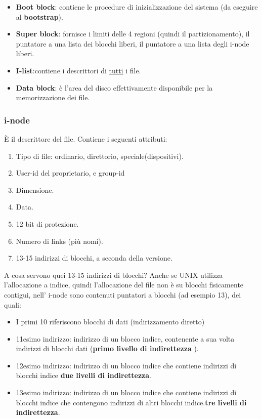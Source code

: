 \documentclass{article}
\begin{document}
\begin{itemize}
    \item \textbf{Boot block}: contiene le procedure di
    inizializzazione del sistema (da eseguire al 
    \textbf{bootstrap}).
    \item \textbf{Super block}: fornisce i limiti delle 4 regioni
    (quindi il partizionamento), il puntatore a una lista dei
     blocchi liberi, il puntatore a una lista degli i-node 
     liberi.
    \item \textbf{I-list}:contiene i descrittori di \underline{tutti} 
    i file.
    \item \textbf{Data block}:  è l'area del disco
    effettivamente disponibile per la memorizzazione dei file.
\end{itemize}

\subsubsection{i-node}
È il descrittore del file. Contiene i seguenti attributi:
\begin{enumerate}
    \item Tipo di file: ordinario, direttorio, speciale(dispositivi).
    \item User-id del proprietario, e group-id
    \item Dimensione.
    \item Data.
    \item 12 bit di protezione.
    \item Numero di links (più nomi).
    \item 13-15 indirizzi di blocchi, a seconda della versione.
\end{enumerate}

\noindent A cosa servono quei 13-15 indirizzi di blocchi? Anche se
UNIX utilizza l'allocazione a indice, quindi l'allocazione del file
 non è su blocchi fisicamente contigui, nell'
i-node sono contenuti puntatori a blocchi (ad esempio 13), dei quali:
\begin{itemize}
    \item I primi 10 riferiscono blocchi di dati
    (indirizzamento diretto)
    \item 11esimo indirizzo: indirizzo di un blocco indice, contenente
    a sua volta indirizzi di blocchi dati (\textbf{primo livello di indirettezza}
    ).
    \item 12esimo indirizzo: indirizzo di un blocco indice che contiene indirizzi 
    di blocchi indice \textbf{due livelli di indirettezza}.
    \item 13esimo indirizzo: indirizzo di un blocco indice che contiene indirizzi 
    di blocchi indice che contengono indirizzi di altri blocchi indice.\textbf{tre livelli di indirettezza}.

\end{itemize}
\end{document}
